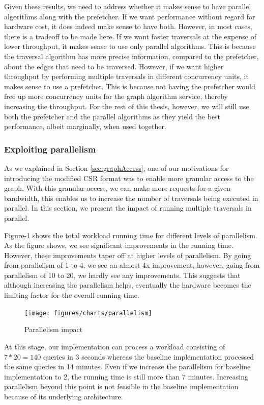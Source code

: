 \medskip
Given these results, we need to address whether it makes sense to have parallel
algorithms along with the prefetcher. If we want performance without regard for
hardware cost, it does indeed make sense to have both. However, in most cases,
there is a tradeoff to be made here. If we want faster traversals at the expense
of lower throughput, it makes sense to use only parallel algorithms. This is
because the traversal algorithm has more precise information, compared to the 
prefetcher, about the edges that need to be traversed. However, if we want
higher throughput by performing multiple traversals in different
concurrency units, it makes sense to use a prefetcher. This is because not
having the prefetcher
would free up more concurrency units for the graph algorithm service, thereby
increasing the throughput. For the rest of this thesis, however, we will still
use both the prefetcher and the parallel algorithms as they yield the best
performance, albeit marginally, when used together.

\subsubsection{Exploiting parallelism}
As we explained in Section \ref{sec:graphAccess}, one of our motivations for
introducing the modified CSR format was to enable more granular access to the
graph. With this granular access, we can make more requests for a given
bandwidth, this enables us to increase the number of traversals being
executed in parallel. In this section, we present the impact of running multiple
traversals in parallel.

\medskip
Figure-\ref{fig:parallelismImpact} shows the total workload running time for
different levels of parallelism. As the figure shows, we see significant
improvements in the running time. However, these improvements taper off at
higher levels of parallelism. By going from parallelism of 1 to 4, we see an
almost 4x improvement, however, going from parallelism of 10 to 20, we hardly
see any improvements. This suggests that although increasing the parallelism
helps, eventually the hardware becomes the limiting factor for the overall
running time. 
\begin{figure}[ht]
    \centering
    \texttt{[image: figures/charts/parallelism]}
    \caption{Parallelism impact}
    \label{fig:parallelismImpact}
\end{figure}

\medskip
At this stage, our implementation can process a workload consisting of
$7*20 = 140$ queries in 3 seconds whereas the baseline implementation processed
the same queries in 14 minutes. Even if we increase the parallelism for baseline
implementation to 2, the running time is still more than 7 minutes. Increasing
parallelism beyond this point is not feasible in the baseline implementation
because of its underlying architecture.

